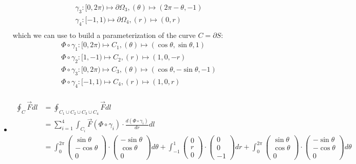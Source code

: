 \documentclass[11pt]{article}
\begin{document}
\begin{solution}
\begin{itemize}
\begin{align*}
	&\gamma_3: [0,2\pi) \mapsto \partial \Omega_3, (\theta) \mapsto (2\pi - \theta, -1)\\
	&\gamma_4: [-1,1) \mapsto \partial \Omega_4, (r) \mapsto (0, r)\\
	\end{align*}
	which we can use to build a parameterization of the curve $C = \partial S$:
	\begin{align*}
	&\Phi \circ \gamma_1: [0,2\pi) \mapsto C_1, (\theta) \mapsto (\cos \theta, \sin \theta, 1)\\
	&\Phi \circ \gamma_2: [1,-1)  \mapsto C_2, (r) \mapsto (1, 0, -r)\\
	&\Phi \circ \gamma_3: [0,2\pi) \mapsto C_3, (\theta) \mapsto (\cos \theta, -\sin \theta, -1)\\
	&\Phi \circ \gamma_4: [-1,1) \mapsto C_4, (r) \mapsto (1, 0, r)\\
	\end{align*}
    \item 
	\begin{align*}
	\oint_C \vec F dl 
	&= 
	\oint_{C_1 \cup C_2 \cup C_3\cup C_4} \vec F dl
	\\
	&= 
	\sum_{i = 1}^4\int_{C_i} \vec F(\Phi\circ \gamma_i) \cdot \frac{d(\Phi\circ \gamma_i)}{dr}dl 
	\\
	&= \int_0^{2\pi} \begin{pmatrix}\sin \theta\\-\cos \theta\\0\end{pmatrix}\cdot\begin{pmatrix}-\sin \theta\\\cos \theta\\ 0\end{pmatrix}d\theta 
	+ 
	\int_{-1}^{1} \begin{pmatrix}0\\r\\0\end{pmatrix}\cdot\begin{pmatrix}0\\0\\-1\end{pmatrix}dr 
	+ 
	\int_0^{2\pi} \begin{pmatrix}\sin \theta\\ \cos \theta\\0\end{pmatrix}\cdot\begin{pmatrix}-\sin \theta\\-\cos \theta\\ 0\end{pmatrix}d\theta 

\end{align*}
\end{itemize}
\end{solution}
\end{document}
